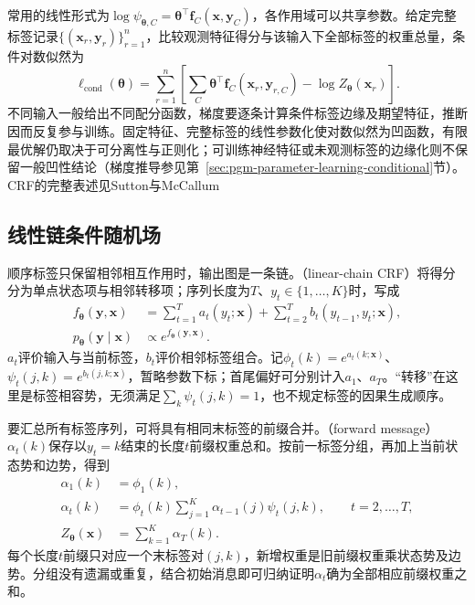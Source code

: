 常用的线性形式为$\log\psi_{\bm{\theta},C}=\bm{\theta}^\top\bm{f}_C(\bm{x},\bm{y}_C)$，各作用域可以共享参数。给定完整标签记录$\{(\bm{x}_r,\bm{y}_r)\}_{r=1}^n$，比较观测特征得分与该输入下全部标签的权重总量，条件对数似然为
\begin{equation}
  \ell_{\mathrm{cond}}(\bm{\theta})
    =\sum_{r=1}^n
       \left[
        \sum_C\bm{\theta}^\top
                    \bm{f}_C(\bm{x}_r,\bm{y}_{r,C})
        -\log Z_{\bm{\theta}}(\bm{x}_r)
       \right].
  \label{eq:pgm-energy-models-crf-likelihood}
\end{equation}
不同输入一般给出不同配分函数，梯度要逐条计算条件标签边缘及期望特征，推断因而反复参与训练。固定特征、完整标签的线性参数化使对数似然为凹函数，有限最优解仍取决于可分离性与正则化；可训练神经特征或未观测标签的边缘化则不保留一般凹性结论（梯度推导参见第~\ref{sec:pgm-parameter-learning-conditional}节）。CRF的完整表述见Sutton与McCallum

\subsection{线性链条件随机场}
\label{sec:pgm-energy-models-linear-chain}

顺序标签只保留相邻相互作用时，输出图是一条链。（linear-chain CRF）将得分分为单点状态项与相邻转移项；序列长度为$T$、$y_t\in\{1,\ldots,K\}$时，写成
\begin{equation}
  \begin{aligned}
    f_{\bm{\theta}}(\bm{y},\bm{x})
      &=\sum_{t=1}^T a_t(y_t;\bm{x})
        +\sum_{t=2}^T b_t(y_{t-1},y_t;\bm{x}),\\
    p_{\bm{\theta}}(\bm{y}\mid\bm{x})
      &\propto e^{f_{\bm{\theta}}(\bm{y},\bm{x})}.
  \end{aligned}
  \label{eq:pgm-energy-models-chain-score}
\end{equation}
$a_t$评价输入与当前标签，$b_t$评价相邻标签组合。记$\phi_t(k)=e^{a_t(k;\bm{x})}$、$\psi_t(j,k)=e^{b_t(j,k;\bm{x})}$，暂略参数下标；首尾偏好可分别计入$a_1$、$a_T$。“转移”在这里是标签相容势，无须满足$\sum_k\psi_t(j,k)=1$，也不规定标签的因果生成顺序。

要汇总所有标签序列，可将具有相同末标签的前缀合并。（forward message）$\alpha_t(k)$保存以$y_t=k$结束的长度$t$前缀权重总和。按前一标签分组，再加上当前状态势和边势，得到
\begin{equation}
  \begin{aligned}
    \alpha_1(k)&=\phi_1(k),\\
    \alpha_t(k)&=\phi_t(k)
       \sum_{j=1}^K\alpha_{t-1}(j)\psi_t(j,k),
       \qquad t=2,\ldots,T,\\
    Z_{\bm{\theta}}(\bm{x})&=\sum_{k=1}^K\alpha_T(k).
  \end{aligned}
  \label{eq:pgm-energy-models-forward}
\end{equation}
每个长度$t$前缀只对应一个末标签对$(j,k)$，新增权重是旧前缀权重乘状态势及边势。分组没有遗漏或重复，结合初始消息即可归纳证明$\alpha_t$确为全部相应前缀权重之和。

